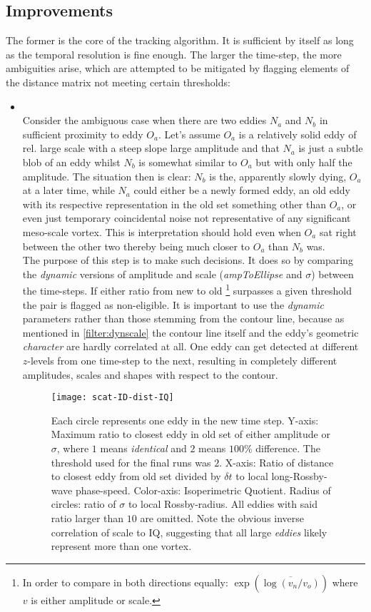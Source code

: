 \subsection*{Improvements}
The former is the core of the tracking algorithm. It is sufficient by itself as long as the temporal resolution is fine enough. The larger the time-step, the more ambiguities arise, which are attempted to be mitigated by flagging elements of the distance matrix not meeting certain thresholds:
\begin{itemize}
	\item
	 \\
	 Consider the ambiguous case when there are two eddies $N_a$ and $N_b$ in sufficient proximity to eddy $O_a$. Let's assume $O_a$ is a relatively solid eddy of rel. large scale with a steep slope \ie large amplitude and that $N_a$ is just a subtle blob of an eddy whilst $N_b$ is somewhat similar to $O_a$ but with only half the amplitude. The situation then is clear: $N_b$ is the, apparently slowly dying, $O_a$ at a later time, while $N_a$ could either be a newly formed eddy, an old eddy with its respective representation in the old set something other than $O_a$, or even just temporary coincidental noise not representative of any significant meso-scale vortex. This is interpretation should hold even when $O_a$ sat right between the other two thereby being much closer to $O_a$ than $N_b$ was.\\
	 The purpose of this step is to make such decisions. It does so by comparing the \textit{dynamic} versions of amplitude and scale (\textit{ampToEllipse} and $\sigma$) between the time-steps. If either ratio from new to old \footnote{In order to compare in both directions equally: $\exp{(\overline{\log{(v_n/v_o)}})}$ where $v$ is either amplitude or scale.} surpasses a given threshold the pair is flagged as non-eligible. It is important to use the \textit{dynamic} parameters rather than those stemming from the contour line, because as mentioned  in \ref{filter:dynscale} the contour line itself and the eddy's  geometric \textit{character} are hardly correlated at all. One eddy can get detected at different $z$-levels from one time-step to the next, resulting in completely different amplitudes, scales and shapes with respect to the contour.
	 \begin{wrapfigure}{r}{0.4\textwidth}
	\texttt{[image: scat-ID-dist-IQ]}
	\caption{Each circle represents one eddy in the new time step. Y-axis: Maximum ratio to closest eddy in old set of either amplitude or $\sigma$, where $1$ means \textit{identical} and $2$ means $100\%$ difference. The threshold used for the final runs was $2$. X-axis: Ratio of distance to closest eddy from old set divided by $\delta t$ to local long-Rossby-wave phase-speed. Color-axis: Isoperimetric Quotient. Radius of circles: ratio of $\sigma$ to local Rossby-radius. All eddies with said ratio larger than $10$ are omitted. Note the obvious inverse correlation of scale to IQ, suggesting that all large \textit{eddies} likely represent more than one vortex. }

\end{wrapfigure}
\end{itemize}
